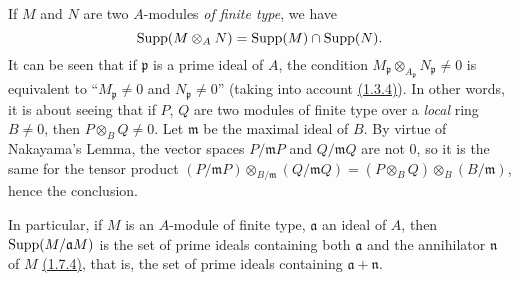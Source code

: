 \begin{env}[1.7.5]
\label{0.1.7.5}
If $M$ and $N$ are two $A$-modules {\em of finite type}, we have
\[
  {\mathop{\mathrm{Supp}}\nolimits}(M\otimes_A N)={\mathop{\mathrm{Supp}}\nolimits}(M)\cap{\mathop{\mathrm{Supp}}\nolimits}(N).
\]
It can be seen that if $\mathfrak{p}$ is a prime ideal of $A$, the condition
$M_\mathfrak{p}\otimes_{A_\mathfrak{p}}N_\mathfrak{p}\neq 0$ is equivalent to
``$M_\mathfrak{p}\neq 0$ and $N_\mathfrak{p}\neq 0$'' (taking into account
\hyperref[0.1.3.4]{(1.3.4)}). In other words, it is about seeing that if $P$, $Q$ are two
modules of finite type over a {\em local} ring $B\neq 0$, then
$P\otimes_B Q\neq 0$. Let $\mathfrak{m}$ be the maximal ideal of $B$. By virtue
of Nakayama's Lemma, the vector spaces $P/\mathfrak{m}P$ and $Q/\mathfrak{m}Q$
are not $0$, so it is the same for the tensor product
$(P/\mathfrak{m}P)\otimes_{B/\mathfrak{m}}(Q/\mathfrak{m}Q)
  =(P\otimes_B Q)\otimes_B(B/\mathfrak{m})$, hence the conclusion.

In particular, if $M$ is an $A$-module of finite type, $\mathfrak{a}$ an ideal
of $A$, then ${\mathop{\mathrm{Supp}}\nolimits}(M/\mathfrak{a}M)$ is the set of prime ideals containing both
$\mathfrak{a}$ and the annihilator $\mathfrak{n}$ of $M$ \hyperref[0.1.7.4]{(1.7.4)}, that
is, the set of prime ideals containing $\mathfrak{a}+\mathfrak{n}$.
\end{env}

